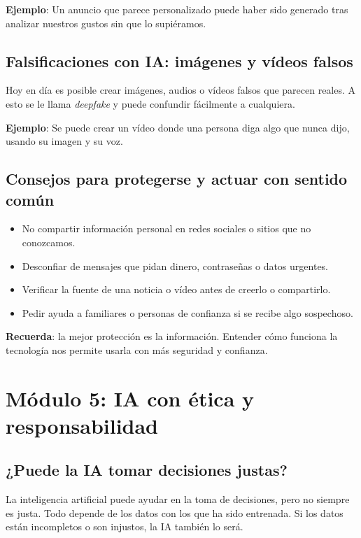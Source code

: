 \documentclass[12pt]{article}
\begin{document}
	\textbf{Ejemplo}: Un anuncio que parece personalizado puede haber sido generado tras analizar nuestros gustos sin que lo supiéramos.
	
	\subsection*{Falsificaciones con IA: imágenes y vídeos falsos}
	Hoy en día es posible crear imágenes, audios o vídeos falsos que parecen reales. A esto se le llama \textit{deepfake} y puede confundir fácilmente a cualquiera.
	
	\textbf{Ejemplo}: Se puede crear un vídeo donde una persona diga algo que nunca dijo, usando su imagen y su voz.
	
	\subsection*{Consejos para protegerse y actuar con sentido común}
	\begin{itemize}
		\item No compartir información personal en redes sociales o sitios que no conozcamos.
		\item Desconfiar de mensajes que pidan dinero, contraseñas o datos urgentes.
		\item Verificar la fuente de una noticia o vídeo antes de creerlo o compartirlo.
		\item Pedir ayuda a familiares o personas de confianza si se recibe algo sospechoso.
	\end{itemize}
	
	\textbf{Recuerda}: la mejor protección es la información. Entender cómo funciona la tecnología nos permite usarla con más seguridad y confianza.
	
	\newpage
	
	\section{\textbf{\normalsize Módulo 5: IA con ética y responsabilidad}}
	
	\subsection*{¿Puede la IA tomar decisiones justas?}
	La inteligencia artificial puede ayudar en la toma de decisiones, pero no siempre es justa. Todo depende de los datos con los que ha sido entrenada. Si los datos están incompletos o son injustos, la IA también lo será.
	
\end{document}

